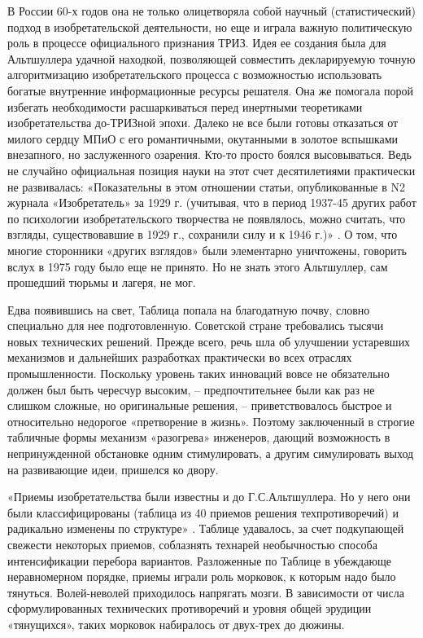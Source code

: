 \documentclass[11pt,a4paper]{article}
\begin{document}
В России 60-х годов она не только олицетворяла собой научный (статистический)
подход в изобретательской деятельности, но еще и играла важную политическую
роль в процессе официального признания ТРИЗ. Идея ее создания была для
Альтшуллера удачной находкой, позволяющей совместить декларируемую точную
алгоритмизацию изобретательского процесса с возможностью использовать богатые
внутренние информационные ресурсы решателя. Она же помогала порой избегать
необходимости расшаркиваться перед инертными теоретиками изобретательства
до-ТРИЗной эпохи. Далеко не все были готовы отказаться от милого сердцу МПиО с
его романтичными, окутанными в золотое вспышками внезапного, но заслуженного
озарения. Кто-то просто боялся высовываться. Ведь не случайно официальная
позиция науки на этот счет десятилетиями практически не развивалась:
«Показательны в этом отношении статьи, опубликованные в N2 журнала
«Изобретатель» за 1929 г. (учитывая, что в период 1937-45 других работ по
психологии изобретательского творчества не появлялось, можно считать, что
взгляды, существовавшие в 1929 г., сохранили силу и к 1946 г.)»
\cite{Altshuller1975}.  О том, что многие сторонники «других взглядов» были
элементарно уничтожены, говорить вслух в 1975 году было еще не принято. Но не
знать этого Альтшуллер, сам прошедший тюрьмы и лагеря, не мог.

Едва появившись на свет, Таблица попала на благодатную почву, словно
специально для нее подготовленную. Советской стране требовались тысячи новых
технических решений. Прежде всего, речь шла об улучшении устаревших механизмов
и дальнейших разработках практически во всех отраслях промышленности.
Поскольку уровень таких инноваций вовсе не обязательно должен был быть
чересчур высоким, -- предпочтительнее были как раз не слишком сложные, но
оригинальные решения, -- приветствовалось быстрое и относительно недорогое
«претворение в жизнь». Поэтому заключенный в строгие табличные формы механизм
«разогрева» инженеров, дающий возможность в непринужденной обстановке одним
стимулировать, а другим симулировать выход на развивающие идеи, пришелся ко
двору.

«Приемы изобретательства были известны и до Г.С.Альтшуллера. Но у него они
были классифицированы (таблица из 40 приемов решения техпротиворечий) и
радикально изменены по структуре» \cite{Murashkovsky2003}. Таблице
удавалось, за счет подкупающей свежести некоторых приемов, соблазнять технарей
необычностью способа интенсификации перебора вариантов. Разложенные по Таблице
в убеждающе неравномерном порядке, приемы играли роль морковок, к которым надо
было тянуться. Волей-неволей приходилось напрягать мозги. В зависимости от
числа сформулированных технических противоречий и уровня общей эрудиции
«тянущихся», таких морковок набиралось от двух-трех до дюжины.
\end{document}
